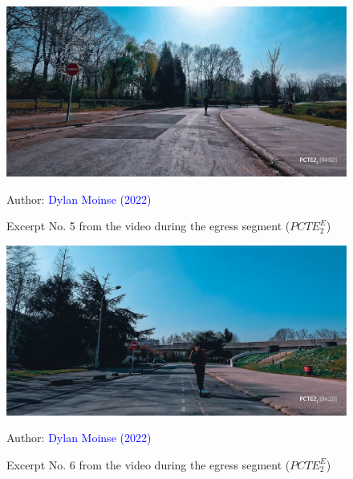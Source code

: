     \begin{figure}[h!]\vspace*{4pt}
        \caption*{Excerpt No. 5 from the video during the egress segment (\(PCTE^{E}_{2}\))}
        \centerline{\includegraphics[width=0.75\columnwidth]{src/Figures/Annexes/Extrait_Video_PCTE2_Egress_5.jpg}}
        \vspace{5pt}
        \begin{flushright}\scriptsize{
        Author: \textcolor{blue}{Dylan Moinse (2022)}
        }\end{flushright}
    \end{figure}

    \begin{figure}[h!]\vspace*{4pt}
        \caption*{Excerpt No. 6 from the video during the egress segment (\(PCTE^{E}_{2}\))}
        \centerline{\includegraphics[width=0.75\columnwidth]{src/Figures/Annexes/Extrait_Video_PCTE2_Egress_6.jpg}}
        \vspace{5pt}
        \begin{flushright}\scriptsize{
        Author: \textcolor{blue}{Dylan Moinse (2022)}
        }\end{flushright}
    \end{figure}

